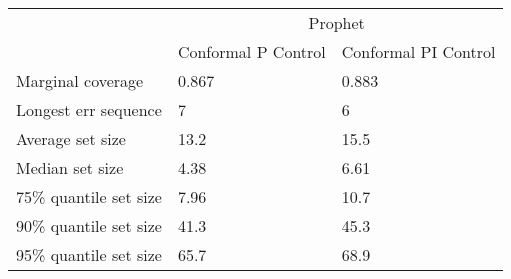 \begin{tabular}{lll}
\toprule
& \multicolumn{2}{c}{Prophet} \\
& Conformal P Control & Conformal PI Control \\
\midrule
Marginal coverage & 0.867 & 0.883 \\
Longest err sequence & 7 & 6 \\
Average set size & 13.2 & 15.5 \\
Median set size & 4.38 & 6.61 \\
75\% quantile set size & 7.96 & 10.7 \\
90\% quantile set size & 41.3 & 45.3 \\
95\% quantile set size & 65.7 & 68.9 \\
\bottomrule
\end{tabular}
